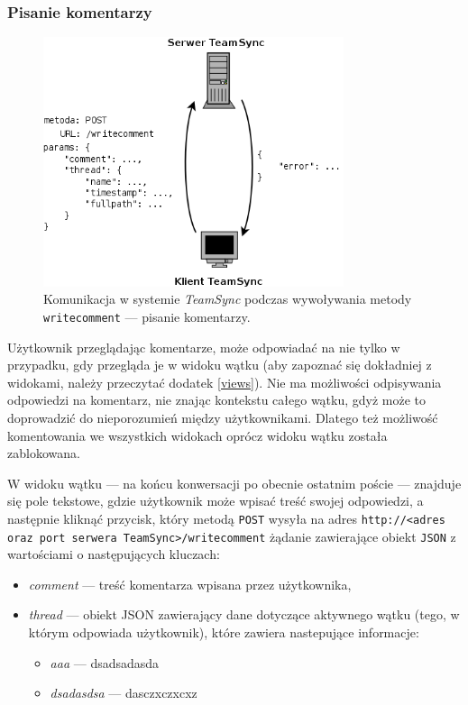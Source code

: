 \subsubsection*{Pisanie komentarzy}

\begin{figure}[h!]
  \vspace{5pt}
  \begin{center}
    \includegraphics[width=250pt]{figures/metwritecomment.png}
  \end{center}
  \caption{Komunikacja w systemie \emph{TeamSync} podczas wywoływania metody \texttt{writecomment} --- pisanie komentarzy.}
  \label{picmetdeletefolder}
\end{figure}

Użytkownik przeglądając komentarze, może odpowiadać na nie tylko w przypadku, gdy przegląda je w widoku wątku (aby zapoznać się dokładniej z widokami, należy przeczytać dodatek \ref{views}). Nie ma możliwości odpisywania odpowiedzi na komentarz, nie znając kontekstu całego wątku, gdyż może to doprowadzić do nieporozumień między użytkownikami. Dlatego też możliwość komentowania we wszystkich widokach oprócz widoku wątku została zablokowana.

W widoku wątku --- na końcu konwersacji po obecnie ostatnim poście --- znajduje się pole tekstowe, gdzie użytkownik może wpisać treść swojej odpowiedzi, a następnie kliknąć przycisk, który metodą \texttt{POST} wysyła na adres \texttt{http://<adres oraz port serwera TeamSync>/\-writecomment} żądanie zawierające obiekt \texttt{JSON} z wartościami o następujących kluczach:

\begin{itemize}[noitemsep]
 \item \emph{comment} --- treść komentarza wpisana przez użytkownika,
 \item \emph{thread} --- obiekt JSON zawierający dane dotyczące aktywnego wątku (tego, w którym odpowiada użytkownik), które zawiera nastepujące informacje:
 \begin{itemize}[noitemsep]
  \item \emph{aaa} --- dsadsadasda
  \item \emph{dsadasdsa} --- dasczxczxcxz
 \end{itemize}
\end{itemize}

